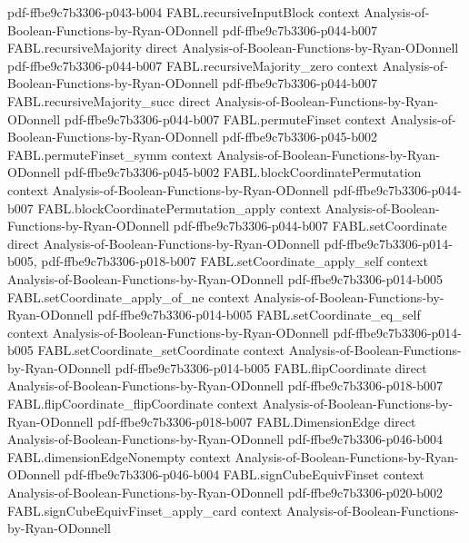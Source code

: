 \begin{theorem}
  {pdf-ffbe9c7b3306-p043-b004}
\proofstep
  {FABL.recursiveInputBlock}
  {context}
  {Analysis-of-Boolean-Functions-by-Ryan-ODonnell}
  {pdf-ffbe9c7b3306-p044-b007}
\proofstep
  {FABL.recursiveMajority}
  {direct}
  {Analysis-of-Boolean-Functions-by-Ryan-ODonnell}
  {pdf-ffbe9c7b3306-p044-b007}
\proofstep
  {FABL.recursiveMajority_zero}
  {context}
  {Analysis-of-Boolean-Functions-by-Ryan-ODonnell}
  {pdf-ffbe9c7b3306-p044-b007}
\proofstep
  {FABL.recursiveMajority_succ}
  {direct}
  {Analysis-of-Boolean-Functions-by-Ryan-ODonnell}
  {pdf-ffbe9c7b3306-p044-b007}
\proofstep
  {FABL.permuteFinset}
  {context}
  {Analysis-of-Boolean-Functions-by-Ryan-ODonnell}
  {pdf-ffbe9c7b3306-p045-b002}
\proofstep
  {FABL.permuteFinset_symm}
  {context}
  {Analysis-of-Boolean-Functions-by-Ryan-ODonnell}
  {pdf-ffbe9c7b3306-p045-b002}
\proofstep
  {FABL.blockCoordinatePermutation}
  {context}
  {Analysis-of-Boolean-Functions-by-Ryan-ODonnell}
  {pdf-ffbe9c7b3306-p044-b007}
\proofstep
  {FABL.blockCoordinatePermutation_apply}
  {context}
  {Analysis-of-Boolean-Functions-by-Ryan-ODonnell}
  {pdf-ffbe9c7b3306-p044-b007}
\proofstep
  {FABL.setCoordinate}
  {direct}
  {Analysis-of-Boolean-Functions-by-Ryan-ODonnell}
  {pdf-ffbe9c7b3306-p014-b005,
    pdf-ffbe9c7b3306-p018-b007}
\proofstep
  {FABL.setCoordinate_apply_self}
  {context}
  {Analysis-of-Boolean-Functions-by-Ryan-ODonnell}
  {pdf-ffbe9c7b3306-p014-b005}
\proofstep
  {FABL.setCoordinate_apply_of_ne}
  {context}
  {Analysis-of-Boolean-Functions-by-Ryan-ODonnell}
  {pdf-ffbe9c7b3306-p014-b005}
\proofstep
  {FABL.setCoordinate_eq_self}
  {context}
  {Analysis-of-Boolean-Functions-by-Ryan-ODonnell}
  {pdf-ffbe9c7b3306-p014-b005}
\proofstep
  {FABL.setCoordinate_setCoordinate}
  {context}
  {Analysis-of-Boolean-Functions-by-Ryan-ODonnell}
  {pdf-ffbe9c7b3306-p014-b005}
\proofstep
  {FABL.flipCoordinate}
  {direct}
  {Analysis-of-Boolean-Functions-by-Ryan-ODonnell}
  {pdf-ffbe9c7b3306-p018-b007}
\proofstep
  {FABL.flipCoordinate_flipCoordinate}
  {context}
  {Analysis-of-Boolean-Functions-by-Ryan-ODonnell}
  {pdf-ffbe9c7b3306-p018-b007}
\proofstep
  {FABL.DimensionEdge}
  {direct}
  {Analysis-of-Boolean-Functions-by-Ryan-ODonnell}
  {pdf-ffbe9c7b3306-p046-b004}
\proofstep
  {FABL.dimensionEdgeNonempty}
  {context}
  {Analysis-of-Boolean-Functions-by-Ryan-ODonnell}
  {pdf-ffbe9c7b3306-p046-b004}
\proofstep
  {FABL.signCubeEquivFinset}
  {context}
  {Analysis-of-Boolean-Functions-by-Ryan-ODonnell}
  {pdf-ffbe9c7b3306-p020-b002}
\proofstep
  {FABL.signCubeEquivFinset_apply_card}
  {context}
  {Analysis-of-Boolean-Functions-by-Ryan-ODonnell}

\end{theorem}
